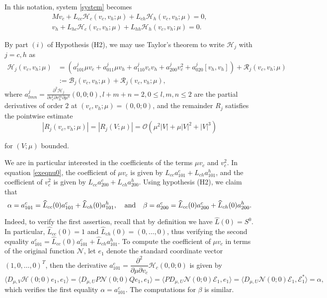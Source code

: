 \documentclass[letterpaper,11pt]{article}
\newcommand{\rmO}{\mathcal{O}}
\newcommand{\B}{\mathcal{B}}
\newcommand{\Rm}{\mathcal{R}}
\newcommand{\Nl}{\mathcal{N}}
\numberwithin{equation}{section}
\theoremstyle{plain}
\theoremstyle{remark}
\begin{document}
In this notation, system \eqref{system} becomes
\begin{align}
M v_c + L_{cc}\mathcal{H}_c(v_c,v_h;\mu) + L_{ch}\mathcal{H}_h(v_c,v_h;\mu)= 0\label{exeqnu0},\\
v_h +  L_{hc}\mathcal{H}_c(v_c,v_h;\mu) + L_{hh}\mathcal{H}_h(v_c,v_h;\mu) = 0 \label{exeqnuh}.
\end{align}


By part $(i)$ of Hypothesis (H2), we may use Taylor's theorem to write $\mathcal{H}_j$ with $j=c,h$ as
\begin{align*}
\mathcal{H}_j(v_c,v_h;\mu) &=\left( a^j_{101} \mu v_c+a^j_{011}\mu v_h+a^j_{110}v_cv_h + a^j_{200}v_c^2+a^j_{020}[v_h,v_h] \right)+ \Rm_j(v_c,v_h;\mu)\\
&:= \B_j(v_c,v_h;\mu)+\Rm_j(v_c,v_h;\mu),
\end{align*}
where $a^j_{lmn} = \frac{\partial^2 \mathcal{H}_j}{\partial v_c^l \partial v_h^m \partial \mu^n}(0,0;0), l+m+n=2, 0\le l,m,n\le 2$ are the partial derivatives of order $2$ at $(v_c,v_h;\mu)=(0,0;0)$, and the remainder $R_j$ satisfies the pointwise estimate
\begin{equation}\label{odR}
|R_j(v_c,v_h;\mu)| = |R_j(V;\mu)| = \rmO(\mu^2|V|+\mu|V|^2+|V|^3)
\end{equation} 


for $(V;\mu)$ bounded.

We are in particular interested in the coefficients of the terms $\mu v_c$ and $v_c^2$. In equation \eqref{exeqnu0}, the coefficient of $\mu v_c$ is given by $L_{cc}a_{101}^c+L_{ch}a_{101}^h$, and the coefficient of $v_c^2$ is given by $L_{cc}a_{200}^c+L_{ch}a_{200}^h$. Using hypothesis (H2), we claim that
\[
\alpha = a_{101}^c =\widehat{L}_{cc}(0)a_{101}^c+\widehat{L}_{ch}(0)a_{101}^h , \hspace{0.1in}\text{ and }\hspace{0.1in}
\beta =a_{200}^c =\widehat{L}_{cc}(0)a_{200}^c+\widehat{L}_{ch}(0)a_{200}^h .
\]

Indeed, to verify the first assertion, recall that by definition we have $\widehat{L}(0) = S^0$. In particular, 
$\widehat{L}_{cc}(0)=1$ and $\widehat{L}_{ch}(0)=(0,\ldots,0)$, thus verifying the second equality $a_{101}^c=\widehat{L}_{cc}(0)a_{101}^c+\widehat{L}_{ch}a_{101}^h$. 
To compute the coefficient of $\mu v_c$ in terms of the 
original function $\Nl$, let $e_1$ denote the standard coordinate vector $(1,0,\ldots,0)^T$, then the derivative 
$a_{101}^c=\dfrac{\partial^2}{\partial \mu \partial v_c}  \mathcal{H}_c(0,0;0)$ is given by
\[
\langle D_{\mu,V}\mathcal{H}(0;0)e_1,e_1\rangle=\langle D_{\mu,U} P\Nl(0;0)Q e_1,e_1\rangle = \langle PD_{\mu,U}\Nl(0;0) \mathcal{E}_1,e_1\rangle  = \langle D_{\mu,U}\Nl(0;0)\mathcal{E}_1,\mathcal{E}_1^*\rangle = \alpha,
\]
which verifies the first equality $\alpha=a_{101}^c$. The computations for $\beta$ is similar.
\end{document}
